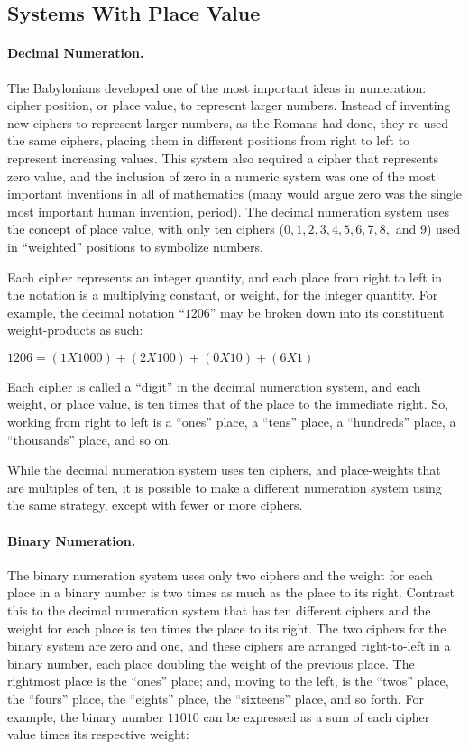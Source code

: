 \subsection{Systems With Place Value}
\label{MF:sub:systems_with_place_value}
\paragraph{Decimal Numeration.} The Babylonians developed one of the most important ideas in numeration: cipher position, or place value, to represent larger numbers. Instead of inventing new ciphers to represent larger numbers, as the Romans had done, they re-used the same ciphers, placing them in different positions from right to left to represent increasing values. This system also required a cipher that represents zero value, and the inclusion of zero in a numeric system was one of the most important inventions in all of mathematics (many would argue zero was the single most important human invention, period). The decimal numeration system uses the concept of place value, with only ten ciphers ($ 0, 1, 2, 3, 4, 5, 6, 7, 8, $ and $ 9 $) used in ``weighted'' positions to symbolize numbers.

Each cipher represents an integer quantity, and each place from right to left in the notation is a multiplying constant, or weight, for the integer quantity. For example, the decimal notation ``$ 1206 $'' may be broken down into its constituent weight-products as such:

\begin{center}
  $ 1206 = (1 X 1000) + (2 X 100) + (0 X 10) + (6 X 1) $
\end{center}

Each cipher is called a ``digit'' in the decimal numeration system, and each weight, or place value, is ten times that of the place to the immediate right. So, working from right to left is a ``ones'' place, a ``tens'' place, a ``hundreds'' place, a ``thousands'' place, and so on.

While the decimal numeration system uses ten ciphers, and place-weights that are multiples of ten, it is possible to make a different numeration system using the same strategy, except with fewer or more ciphers.

\paragraph{Binary Numeration.} The binary numeration system uses only two ciphers and the weight for each place in a binary number is two times as much as the place to its right. Contrast this to the decimal numeration system that has ten different ciphers and the weight for each place is ten times the place to its right. The two ciphers for the binary system are zero and one, and these ciphers are arranged right-to-left in a binary number, each place doubling the weight of the previous place. The rightmost place is the ``ones'' place; and, moving to the left, is the ``twos'' place, the ``fours'' place, the ``eights'' place, the ``sixteens'' place, and so forth. For example, the binary number $ 11010 $ can be expressed as a sum of each cipher value times its respective weight:

